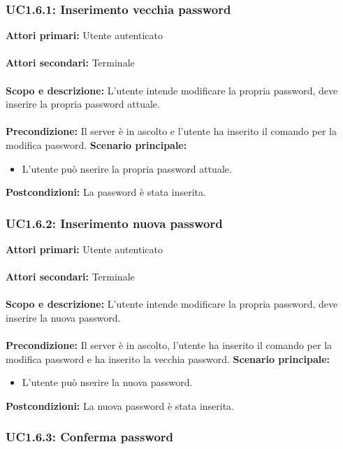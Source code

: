 \documentclass{scalatekids-article}
\begin{document}
\subsubsection{UC1.6.1: Inserimento vecchia password}

\textbf{Attori primari:} Utente autenticato\\ \\
\textbf{Attori secondari:} Terminale\\ \\
\textbf{Scopo e descrizione:} L'utente intende modificare la propria password, deve inserire la propria password attuale.\\ \\
\textbf{Precondizione:} Il server è in ascolto e l'utente ha inserito il comando per la modifica password.
\textbf{Scenario principale:}
\begin{itemize}
  \item L'utente può nserire la propria password attuale.
\end{itemize}
\textbf{Postcondizioni:} La password è stata inserita.

\subsubsection{UC1.6.2: Inserimento nuova password}

\textbf{Attori primari:} Utente autenticato\\ \\
\textbf{Attori secondari:} Terminale\\ \\
\textbf{Scopo e descrizione:} L'utente intende modificare la propria password, deve inserire la nuova password.\\ \\
\textbf{Precondizione:} Il server è in ascolto, l'utente ha inserito il comando per la modifica password e ha inserito la vecchia password.
\textbf{Scenario principale:}
\begin{itemize}
  \item L'utente può nserire la nuova password.
\end{itemize}
\textbf{Postcondizioni:} La nuova password è stata inserita.

\subsubsection{UC1.6.3: Conferma password}
\end{document}
